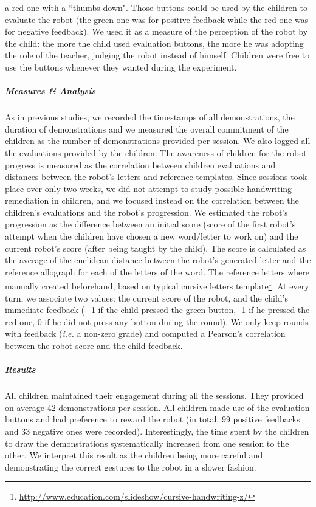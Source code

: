 \documentclass[10pt,a4paper]{article}
\newcommand{\ie}{\textit{i.e.}\xspace}
\begin{document}
a red one with a ``thumbs down". Those buttons could be used by the children to evaluate the
robot (the green one was for positive feedback while the red one was for negative feedback). 
We used it as a measure of the perception of the robot by the child: the more the
child used evaluation buttons, the more he was adopting the role of the teacher, judging the
robot instead of himself. Children were free to use the buttons whenever they wanted during the experiment.
\subparagraph{Measures \& Analysis}
As in previous studies, we recorded the timestamps of all demonstrations, the duration of demonstrations and we measured the overall commitment of the children as the number of demonstrations provided per session. 
We also logged all the evaluations provided by the children. The awareness of children for the robot progress is measured as the correlation between children evaluations and distances between the robot's letters and reference templates.
Since sessions took place over only two weeks, we did not attempt to study possible
handwriting remediation in children, and we focused instead on the correlation between the children's evaluations and the robot's progression.
We estimated the robot's progression as the difference between an initial score
(score of the first robot's attempt when the children have chosen a new word/letter to
work on) and the current robot's score (after being taught by the child). The
score is calculated as the average of the euclidean
distance between the robot's generated letter and the reference allograph for each of the letters of the
word. The reference letters where manually created beforehand, based on typical cursive letters template\footnote{\url{http://www.education.com/slideshow/cursive-handwriting-z/}}. At every turn, we associate two values: the current score of the robot, and the child's immediate feedback (+1 if the child pressed the green button, -1 if he pressed the red one, 0 if he did not press any button during the round). We only keep rounds with feedback (\ie a non-zero grade) and computed a Pearson's correlation between the robot score and the child feedback.
\subparagraph{Results}
All children maintained their engagement during all the sessions. They provided
on average 42 demonstrations per session. All children made use of the evaluation buttons and
had preference to reward the robot (in total, 99 positive feedbacks and 33 negative ones were recorded). Interestingly, the time spent by the children to draw the demonstrations systematically increased from one session to the other. We interpret this result as the children being more careful and demonstrating the correct gestures to the robot in a slower fashion.
\end{document}
